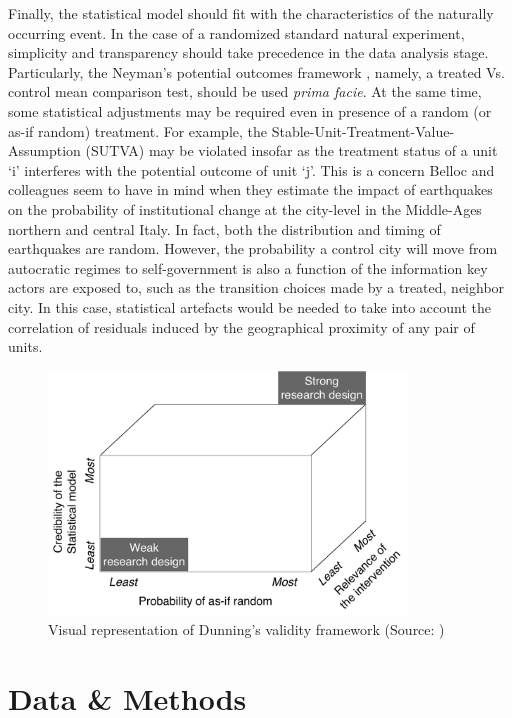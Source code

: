 \documentclass[nobib]{tufte-handout}
\begin{document}
\begin{refsection}
Finally, the statistical model should fit with the characteristics of the
naturally occurring event. In the case of a randomized standard natural
experiment, simplicity and transparency should take precedence in the data
analysis stage. Particularly, the Neyman's potential outcomes framework
\parencite[][]{Splawa1990}, namely, a treated Vs. control mean comparison test,
should be used \emph{prima facie}. At the same time, some statistical
adjustments may be required even in presence of a random (or as-if random)
treatment. For example, the Stable-Unit-Treatment-Value-Assumption (SUTVA) may
be violated insofar as the treatment status of a unit `i' interferes with the
potential outcome of unit `j'. This is a concern Belloc and colleagues
\parencite*[][]{Belloc2016} seem to have in mind when they estimate the impact
of earthquakes on the probability of institutional change at the city-level in
the Middle-Ages northern and central Italy. In fact, both the distribution and
timing of earthquakes are random. However, the probability a control city will
move from autocratic regimes to self-government is also a function of the
information key actors are exposed to, such as the transition choices made by a
treated, neighbor city. In this case, statistical artefacts would be needed to
take into account the correlation of residuals induced by the geographical
proximity of any pair of units.

\begin{figure}[]
    \centering
    \includegraphics[width=0.85\textwidth]{exhibits/validity_framework.pdf}
    \caption{Visual representation of Dunning's validity framework (Source:
    \parencite[][page 31]{Dunning2012})}
    \label{fig:validity_framework}
\end{figure}

\section{Data \& Methods}
\label{sec:article_selection}


\end{refsection}
\end{document}
